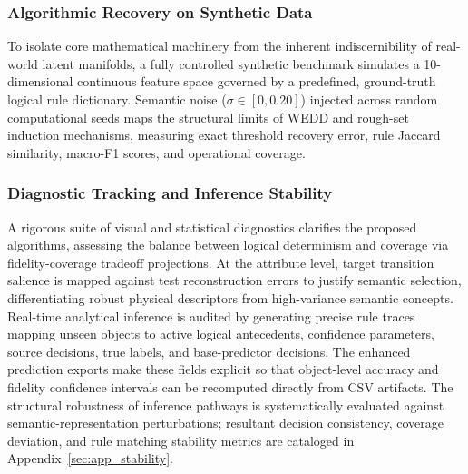 \documentclass[make,article,submit,pdftex,moreauthors]{Definitions/mdpi}
\begin{document}
\subsubsection{Algorithmic Recovery on Synthetic Data}
\label{subsubsec:algorithmic_recovery}

To isolate core mathematical machinery from the inherent indiscernibility of real-world latent manifolds, a fully controlled synthetic benchmark simulates a 10-dimensional continuous feature space governed by a predefined, ground-truth logical rule dictionary. Semantic noise ($\sigma \in [0, 0.20]$) injected across random computational seeds maps the structural limits of WEDD and rough-set induction mechanisms, measuring exact threshold recovery error, rule Jaccard similarity, macro-F1 scores, and operational coverage.

\subsubsection{Diagnostic Tracking and Inference Stability}
\label{subsubsec:diagnostic_tracking}

A rigorous suite of visual and statistical diagnostics clarifies the proposed algorithms, assessing the balance between logical determinism and coverage via fidelity-coverage tradeoff projections. At the attribute level, target transition salience is mapped against test reconstruction errors to justify semantic selection, differentiating robust physical descriptors from high-variance semantic concepts. Real-time analytical inference is audited by generating precise rule traces mapping unseen objects to active logical antecedents, confidence parameters, source decisions, true labels, and base-predictor decisions. The enhanced prediction exports make these fields explicit so that object-level accuracy and fidelity confidence intervals can be recomputed directly from CSV artifacts. The structural robustness of inference pathways is systematically evaluated against semantic-representation perturbations; resultant decision consistency, coverage deviation, and rule matching stability metrics are cataloged in Appendix~\ref{sec:app_stability}.
\end{document}
